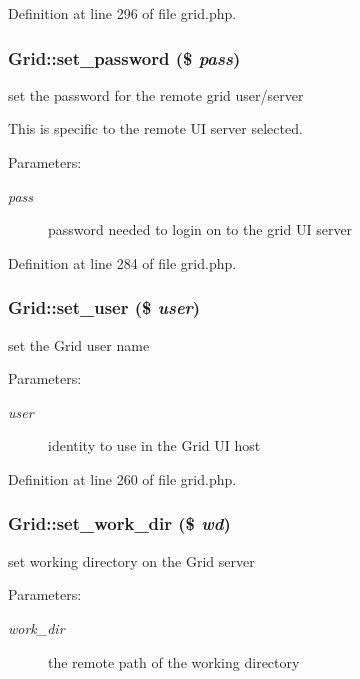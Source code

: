 Definition at line 296 of file grid.php.
\subsubsection{\setlength{\rightskip}{0pt plus 5cm}Grid::set\_\-password (\$ {\em pass})}\label{classGrid_a3}


set the password for the remote grid user/server 

This is specific to the remote UI server selected.

\begin{Desc}
\item[Parameters:]
\begin{description}
\item[{\em pass}]password needed to login on to the grid UI server \end{description}
\end{Desc}


Definition at line 284 of file grid.php.
\subsubsection{\setlength{\rightskip}{0pt plus 5cm}Grid::set\_\-user (\$ {\em user})}\label{classGrid_a1}


set the Grid user name 

\begin{Desc}
\item[Parameters:]
\begin{description}
\item[{\em user}]identity to use in the Grid UI host \end{description}
\end{Desc}


Definition at line 260 of file grid.php.
\subsubsection{\setlength{\rightskip}{0pt plus 5cm}Grid::set\_\-work\_\-dir (\$ {\em wd})}\label{classGrid_a5}


set working directory on the Grid server 

\begin{Desc}
\item[Parameters:]
\begin{description}
\item[{\em work\_\-dir}]the remote path of the working directory \end{description}
\end{Desc}


